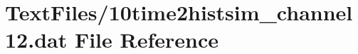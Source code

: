 \hypertarget{10time2histsim__channel12_8dat}{}\section{Text\+Files/10time2histsim\+\_\+channel12.dat File Reference}
\label{10time2histsim__channel12_8dat}
